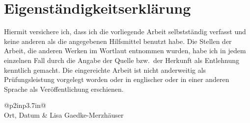 \documentclass[../draft_1.tex]{subfiles}
\begin{document}
\section*{Eigenst\"andigkeitserkl\"arung}


\vspace{1.5cm}
Hiermit versichere ich, dass ich die vorliegende Arbeit selbstst\"andig verfasst und keine anderen als die angegebenen Hilfsmittel benutzt habe. Die Stellen der Arbeit, die anderen Werken im Wortlaut entnommen wurden, habe ich in jedem einzelnen Fall durch die Angabe der Quelle bzw.\ der Herkunft als Entlehnung kenntlich gemacht. Die eingereichte Arbeit ist nicht anderweitig als Pr\"ufungsleistung vorgelegt worden oder in englischer oder in einer anderen Sprache als Ver\"offentlichung erschienen.
\vspace{1.5cm}



\begin{tabular}{@{}p{2in}p{3.7in}@{}}
	 \\
	Ort, Datum & Lisa Gaedke-Merzh\"auser \\
\end{tabular}
\end{document}
